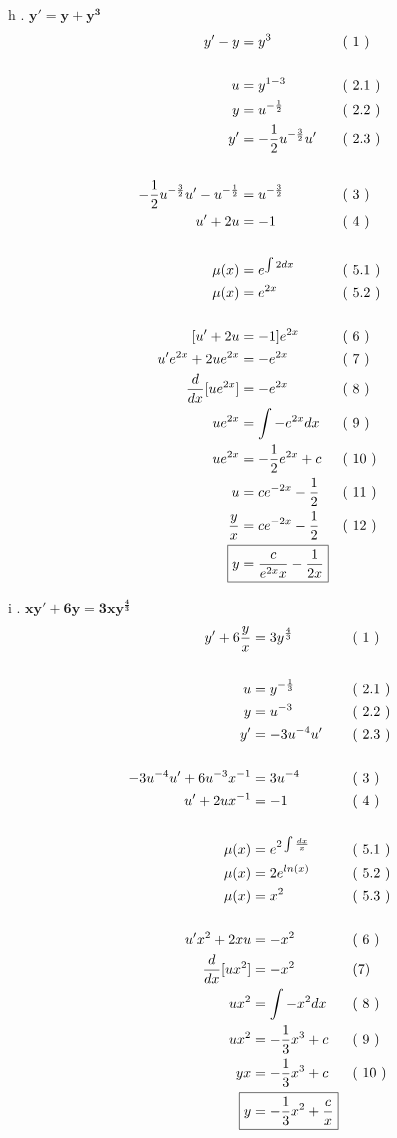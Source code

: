 \documentclass{article}
\newcommand{\newLine}[3]{ #1 & = #2 && \text{(#3)}\\ }
\newcommand{\finalAnswer}[2]{ \Aboxed{ #1 & = #2 } }
\newcommand{\newProblem}[2]{ \hspace{10mm} #1. $
\boldsymbol{ #2 }
$  \break }
\newcommand{\e}[1]{e^{#1}}
\begin{document}
\begin{flushleft}
        \newProblem{ h } { y' = y + y^3 }
            \begin{align*}
                \newLine{ y' - y } { y^3 } { 1 }
                \\
                \newLine{ u }{ y^{ 1 - 3 } }{ 2.1 }
                \newLine{ y } { u^{-\frac{1}{2}} } { 2.2 }
                \newLine{ y' } { -\frac{1}{2} u^{-\frac{3}{2}} u' } { 2.3 }
                \\
                \newLine{ -\frac{1}{2} u^{-\frac{3}{2}} u' - u^{-\frac{1}{2}} } { u^{-\frac{3}{2}} } { 3 }
                \newLine{ u' + 2u } { -1 } { 4 }
                \\
                \newLine{ \mu(x) } { \e{ \int 2 dx} } { 5.1 }
                \newLine{ \mu(x) } { \e{ 2x } } { 5.2 }
                \\
                \newLine{ [ u' +2u } { -1 ] \e{2x} } { 6 }
                \newLine{ u'\e{ 2x } + 2u\e{ 2x } } { -\e{2x} } { 7 }
                \newLine{ \frac{d}{dx} [ u\e{2x} ] } { -\e{2x} } { 8 }
                \newLine{ u\e{2x} } { \int -\e{2x} dx } { 9 }
                \newLine{ u\e{2x} } { -\frac{1}{2} \e{2x} + c } { 10 }
                \newLine{ u } { c\e{-2x} -\frac{1}{2} } { 11 }
                \newLine{ \frac{y}{x} } { c\e{-2x} -\frac{1}{2} } { 12 }
                \finalAnswer{ y } { \frac{ c }{ \e{2x}x } - \frac{ 1 }{ 2x }}
            \end{align*}

        \newProblem{ i }{ xy' + 6y = 3xy^{\frac{4}{3}} }
            \begin{align*}
                \newLine{ y' + 6\frac{y}{x} } { 3y^{ \frac{4}{3} } } { 1 }
                \\
                \newLine{ u } { y^{-\frac{1}{3}} } { 2.1 }
                \newLine{ y } { u^{ -3 } } { 2.2 }
                \newLine{ y' } { -3u^{-4} u' } { 2.3 }
                \\
                \newLine{ -3u^{-4}u' +6u^{-3}x^{-1} } { 3u^{-4} } { 3 }
                \newLine{ u' + 2ux^{-1} } { -1 } { 4 }
                \\
                \newLine{ \mu(x) } { \e{ 2\int \frac{dx}{x} }  } { 5.1 }
                \newLine{ \mu(x) } { 2\e{ln(x)} } { 5.2 }
                \newLine{ \mu(x) } { x^2 } { 5.3 }
                \\
                \newLine{ u'x^2 + 2xu } { -x^2 } { 6 }
                \newLine{ \frac{d}{dx}[ ux^2 ] }{ -x^2 }{7}
                \newLine{ ux^2 } { \int -x^2 dx } { 8 }
                \newLine{ ux^2 } { -\frac{1}{3}x^3 + c } { 9 }
                \newLine{ yx } { -\frac{1}{3}x^3 + c} { 10 }
                \finalAnswer{ y } { -\frac{1}{3}x^2 + \frac{c}{x} }
            \end{align*}
        

\end{flushleft}
\end{document}
